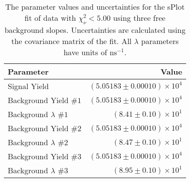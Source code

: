 
\begin{table}[ht]
    \begin{center}
        \begin{tabular}{lr}\toprule
            Parameter & Value \\\midrule
            Signal Yield & $(5.05183 \pm 0.00010) \times 10^{4}$ \\
            Background Yield $\#1$ & $(5.05183 \pm 0.00010) \times 10^{4}$ \\
            Background $\lambda$ $\#1$ & $(8.41 \pm 0.10) \times 10^{1}$ \\
            Background Yield $\#2$ & $(5.05183 \pm 0.00010) \times 10^{4}$ \\
            Background $\lambda$ $\#2$ & $(8.47 \pm 0.10) \times 10^{1}$ \\
            Background Yield $\#3$ & $(5.05183 \pm 0.00010) \times 10^{4}$ \\
            Background $\lambda$ $\#3$ & $(8.95 \pm 0.10) \times 10^{1}$ \\\bottomrule
        \end{tabular}
        \caption{The parameter values and uncertainties for the sPlot fit of data with $\chi^2_\nu < 5.00$ using three free background slopes. Uncertainties are calculated using the covariance matrix of the fit. All $\lambda$ parameters have units of $\si{\nano\second}^{-1}$.}\label{tab:splot-fit-results-chisqdof-5.00-free-3}
    \end{center}
\end{table}
